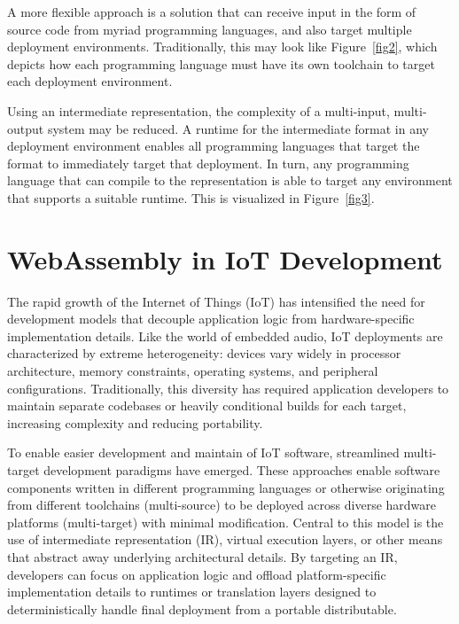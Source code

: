\vspace{12pt}

A more flexible approach is a solution that can receive input in the form of source code from myriad programming languages, and also target multiple deployment environments. Traditionally, this may look like Figure~\ref{fig2}, which depicts how each programming language must have its own toolchain to target each deployment environment.

Using an intermediate representation, the complexity of a multi-input, multi-output system may be reduced. A runtime for the intermediate format in any deployment environment enables all programming languages that target the format to immediately target that deployment. In turn, any programming language that can compile to the representation is able to target any environment that supports a suitable runtime. This is visualized in Figure~\ref{fig3}.

\section{ WebAssembly in IoT Development }

The rapid growth of the Internet of Things (IoT) has intensified the need for development models that decouple application logic from hardware-specific implementation details\cite{PATEL201562}. Like the world of embedded audio, IoT deployments are characterized by extreme heterogeneity: devices vary widely in processor architecture, memory constraints, operating systems, and peripheral configurations. Traditionally, this diversity has required application developers to maintain separate codebases or heavily conditional builds for each target, increasing complexity and reducing portability.

To enable easier development and maintain of IoT software, streamlined multi-target development paradigms have emerged. These approaches enable software components written in different programming languages or otherwise originating from different toolchains (multi-source) to be deployed across diverse hardware platforms (multi-target) with minimal modification. Central to this model is the use of intermediate representation (IR), virtual execution layers, or other means that abstract away underlying architectural details. By targeting an IR, developers can focus on application logic and offload platform-specific implementation details to runtimes or translation layers designed to deterministically handle final deployment from a portable distributable.

